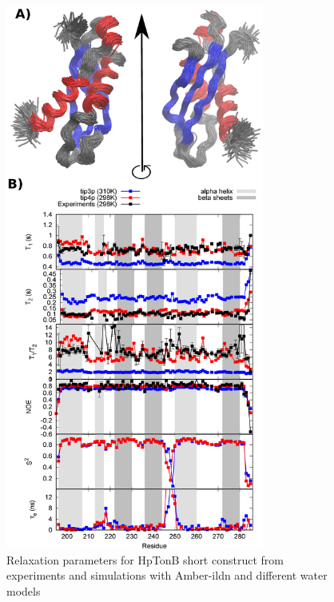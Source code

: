 \documentclass[pre,aps,floatfix,authordate1-4,twocolumn]{revtex4-1}
\begin{document}
\begin{figure}[!h]
  \includegraphics[width=8.5cm]{../Figs/RELdataHpTonB.eps}%
  \caption{Relaxation parameters for HpTonB short construct from
    experiments and simulations with Amber-ildn and different water models
    \label{HpTonBrelaxationDATA}}%
\end{figure}
\end{document}
